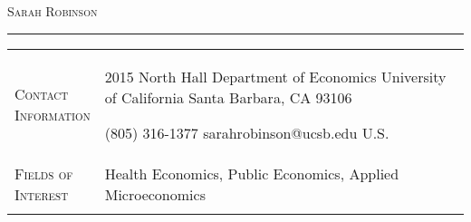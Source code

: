 \documentclass[11pt]{article}
\begin{document}
\thispagestyle{firstpage}

\begin{center}

{\Huge\textsc{Sarah Robinson}} \\[5pt]



\end{center}

\vspace{-6pt}

\noindent\rule{\textwidth}{1pt}

\vspace{6pt}

\begin{tabularx}{\textwidth}{@{}Y Z@{}}
	
	
	\textsc{Contact \newline Information} & 
	\begin{minipage}[t]{0.35\textwidth}
		2015 North Hall \newline
		Department of Economics \newline
		University of California \newline
		Santa Barbara, CA 93106
	\end{minipage}\begin{minipage}[t]{0.4\textwidth}
	 (805) 316-1377 \newline
	 sarahrobinson@ucsb.edu \newline
	 \href{https://www.s-robinson.com}{\color{blue}{www.s-robinson.com}} \newline
	 U.S.
\end{minipage}
	\newline  \\ \addlinespace[15pt] 
	
	\textsc{Fields of \newline Interest} & 
	Health Economics, Public Economics, Applied Microeconomics
	 \\ \addlinespace[15pt] 
	

\end{tabularx}
\end{document}
